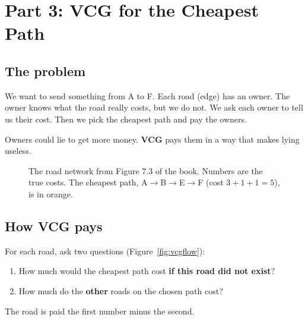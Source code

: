 \documentclass[11pt,a4paper]{article}
\begin{document}
\section{Part 3: VCG for the Cheapest Path}

\subsection{The problem}

We want to send something from A to F. Each road (edge) has an owner. The owner knows what the road really costs, but we do not.
We ask each owner to tell us their cost. Then we pick the cheapest path and pay the owners.

Owners could lie to get more money. \textbf{VCG} pays them in a way that makes lying useless.

\begin{figure}[h]
  \centering
  \caption{The road network from Figure 7.3 of the book. Numbers are the true costs. The cheapest path, A$\to$B$\to$E$\to$F (cost $3+1+1=5$), is in orange.}
  \label{fig:graph}
\end{figure}

\subsection{How VCG pays}

For each road, ask two questions (Figure~\ref{fig:vcgflow}):
\begin{enumerate}
  \item How much would the cheapest path cost \textbf{if this road did not exist}?
  \item How much do the \textbf{other} roads on the chosen path cost?
\end{enumerate}
The road is paid the first number minus the second.
\end{document}
